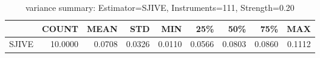\begin{table}[ht]
\centering
\caption{variance summary: Estimator=SJIVE, Instruments=111, Strength=0.20}
\begin{tabular}{lrrrrrrrr}
\toprule
 & COUNT & MEAN & STD & MIN & 25\% & 50\% & 75\% & MAX \\
\midrule
SJIVE & 10.0000 & 0.0708 & 0.0326 & 0.0110 & 0.0566 & 0.0803 & 0.0860 & 0.1112 \\
\bottomrule
\end{tabular}
\end{table}
